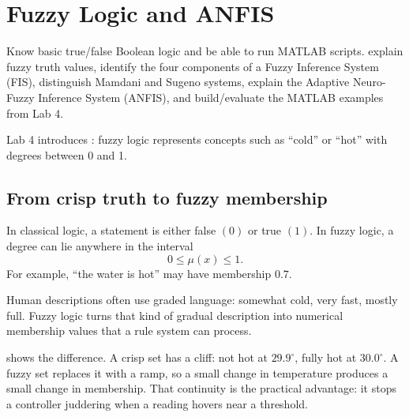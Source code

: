 \chapter{Fuzzy Logic and ANFIS}
\label{ch:fuzzy}

\chapterguide%
  {Know basic true/false Boolean logic and be able to run MATLAB scripts.}
  {explain fuzzy truth values, identify the four components of a Fuzzy Inference System (FIS), distinguish Mamdani and Sugeno systems, explain the Adaptive Neuro-Fuzzy Inference System (ANFIS), and build/evaluate the MATLAB examples from Lab 4.}

Lab 4 introduces : fuzzy logic represents concepts such as ``cold'' or ``hot'' with degrees between 0 and 1.

\section{From crisp truth to fuzzy membership}

In classical logic, a statement is either false \((0)\) or true \((1)\). In fuzzy logic, a degree can lie anywhere in the interval
\[
0\leq \mu(x)\leq 1.
\]
For example, ``the water is hot'' may have membership \(0.7\).

\begin{intuition}
Human descriptions often use graded language: somewhat cold, very fast, mostly full. Fuzzy logic turns that kind of gradual description into numerical membership values that a rule system can process.
\end{intuition}

 shows the difference. A crisp set has a cliff: not hot at
$29.9^\circ$, fully hot at $30.0^\circ$. A fuzzy set replaces it with a ramp, so a small
change in temperature produces a small change in membership. That continuity is the practical
advantage: it stops a controller juddering when a reading hovers near a threshold.


